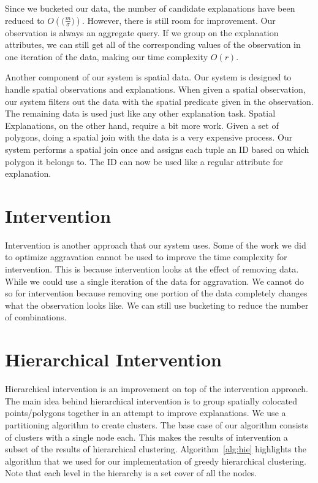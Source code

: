 Since we bucketed our data, the number of candidate explanations have been reduced to $O(\big(\frac{m}{\sigma}\big))$. However, there is still room for improvement. Our observation is always an aggregate query. If we group on the explanation attributes, we can still get all of the corresponding values of the observation in one iteration of the data, making our time complexity $O(r)$.

Another component of our system is spatial data. Our system is designed to handle spatial observations and explanations. When given a spatial observation, our system filters out the data with the spatial predicate given in the observation. The remaining data is used just like any other explanation task. Spatial Explanations, on the other hand, require a bit more work. Given a set of polygons, doing a spatial join with the data is a very expensive process. Our system performs a spatial join once and assigns each tuple an ID based on which polygon it belongs to. The ID can now be used like a regular attribute for explanation.

\section{Intervention}
\label{intervention_impl}

Intervention is another approach that our system uses. Some of the work we did to optimize aggravation cannot be used to improve the time complexity for intervention. This is because intervention looks at the effect of removing data. While we could use a single iteration of the data for aggravation. We cannot do so for intervention because removing one portion of the data completely changes what the observation looks like. We can still use bucketing to reduce the number of combinations.


\section{Hierarchical Intervention}
\label{sec:hie_impl}
Hierarchical intervention is an improvement on top of the intervention approach. The main idea behind hierarchical intervention is to group spatially colocated points/polygons together in an attempt to improve explanations. We use a partitioning algorithm to create clusters. The base case of our algorithm consists of clusters with a single node each. This makes the results of intervention a subset of the results of hierarchical clustering. Algorithm~\ref{alg:hie} highlights the algorithm that we used for our implementation of greedy hierarchical clustering. Note that each level in the hierarchy is a set cover of all the nodes. 


